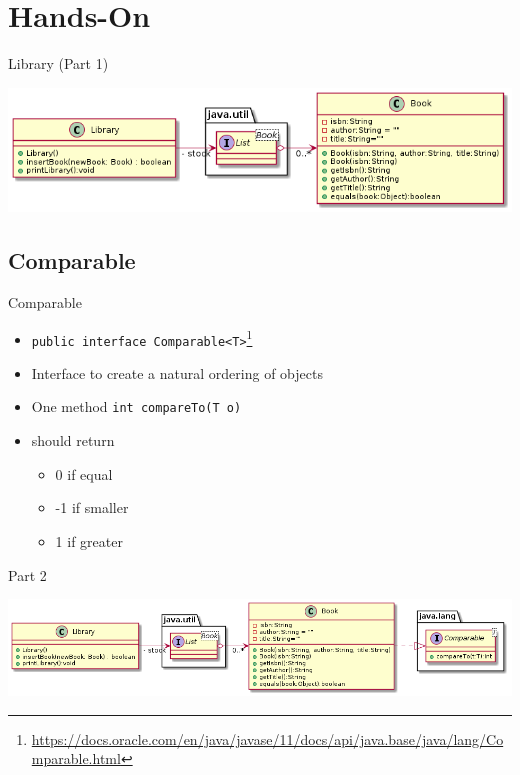 	\section{Hands-On}
	\begin{frame}[fragile]{Library (Part 1)}
		
		\begin{center}
			\includegraphics[width=\textwidth]{07_collection/hands_on_01.png}
		\end{center}
		
		
	\end{frame}
	\subsection{Comparable}
	\begin{frame}{Comparable}
		\begin{itemize}
			\item \texttt{public interface Comparable<T>}\footnote{\url{https://docs.oracle.com/en/java/javase/11/docs/api/java.base/java/lang/Comparable.html}}
			\item Interface to create a natural ordering of objects
			\item One method \texttt{int compareTo(T o)}
			\item should return
			\begin{itemize}
				\item 0 if equal
				\item -1 if smaller
				\item 1 if greater
			\end{itemize}
		\end{itemize}
		
		
		
	\end{frame}
	\begin{frame}{Part 2}
		
		\begin{center}
			\includegraphics[width=\textwidth]{07_collection/hands_on_02.png}
		\end{center}
		
	\end{frame}

